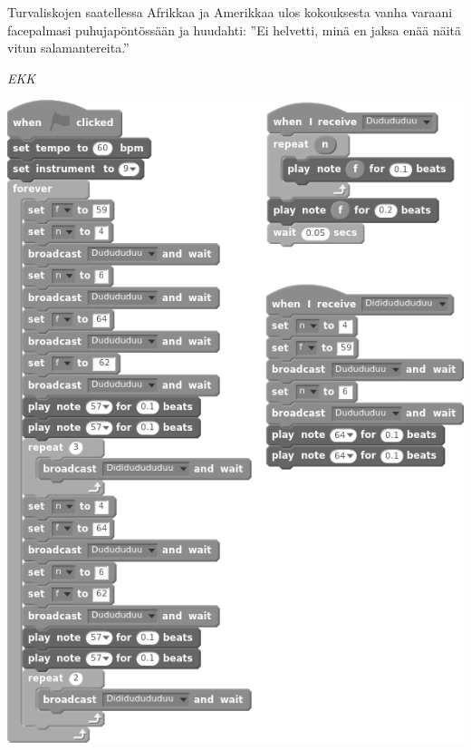 {Turvaliskojen saatellessa Afrikkaa ja Amerikkaa ulos ko\-kouk\-ses\-ta vanha varaani facepalmasi puhujapöntössään ja huudahti: ''Ei helvetti, minä en jaksa enää näitä vitun sala\-man\-te\-rei\-ta.''\\
\vspace{3mm}

\emph{EKK}}
\newpage
\pagecolor{black!5}\afterpage{\nopagecolor}
\noindent
\includegraphics[scale=1.5]{graphics/scratch.png}
\clearpage
\headerfooteron{}
